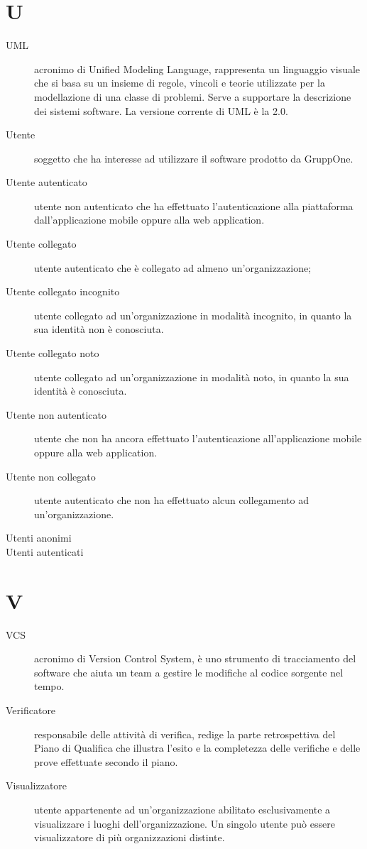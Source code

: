 \documentclass{article}
\begin{document}
\section{U}
\begin{description}
  \item[UML] acronimo di Unified Modeling Language, rappresenta un linguaggio visuale che si basa su un insieme di regole, vincoli e teorie utilizzate per la modellazione di una classe di problemi. Serve a supportare la descrizione dei sistemi software. La versione corrente di UML è la 2.0.
  \item[Utente] soggetto che ha interesse ad utilizzare il software prodotto da GruppOne.
  \item[Utente autenticato] utente non autenticato che ha effettuato l'autenticazione alla piattaforma dall'applicazione mobile oppure alla web application.
  \item[Utente collegato] utente autenticato che è collegato ad almeno un'organizzazione;
  \item[Utente collegato incognito] utente collegato ad un'organizzazione in modalità incognito, in quanto la sua identità non è conosciuta.
  \item[Utente collegato noto] utente collegato ad un'organizzazione in modalità noto, in quanto la sua identità è conosciuta.
  \item[Utente non autenticato] utente che non ha ancora effettuato l'autenticazione all'applicazione mobile oppure alla web application.
  \item[Utente non collegato] utente autenticato che non ha effettuato alcun collegamento ad un'organizzazione.
  \item[Utenti anonimi] 
  \item[Utenti autenticati] 
\end{description}
\newpage
\section{V}
\begin{description}
  \item[VCS] acronimo di Version Control System, è uno strumento di tracciamento del software che aiuta un team a gestire le modifiche al codice sorgente nel tempo.
  \item[Verificatore] responsabile delle attività di verifica, redige la parte retrospettiva del Piano di Qualifica che illustra l'esito e la completezza delle verifiche e delle prove effettuate secondo il piano.
  \item[Visualizzatore] utente appartenente ad un'organizzazione abilitato esclusivamente a visualizzare i luoghi dell'organizzazione. Un singolo utente può essere visualizzatore di più organizzazioni distinte.
\end{description}
\newpage
\end{document}
